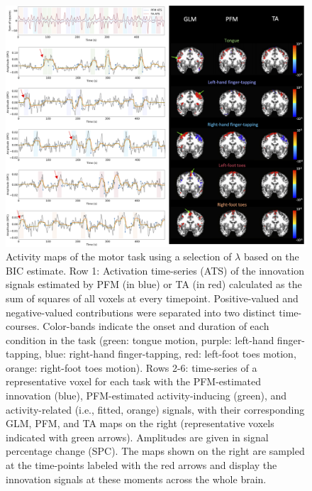 \begin{figure}[t!]
    \begin{center}
        \includegraphics[width=\textwidth]{figures/task_maps.png}
    \end{center}
    \caption{Activity maps of the motor task using a selection of $\lambda$ based on the BIC estimate. Row 1: Activation time-series (ATS) of the innovation signals estimated by PFM (in blue) or TA (in red) calculated as the sum of squares of all voxels at every timepoint. Positive-valued and negative-valued contributions were separated into two distinct time-courses. Color-bands indicate the onset and duration of each condition in the task (green: tongue motion, purple: left-hand finger-tapping, blue: right-hand finger-tapping, red: left-foot toes motion, orange: right-foot toes motion). Rows 2-6: time-series of a representative voxel for each task with the PFM-estimated innovation (blue), PFM-estimated activity-inducing (green), and activity-related (i.e., fitted, orange) signals, with their corresponding GLM, PFM, and TA maps on the right (representative voxels indicated with green arrows). Amplitudes are given in signal percentage change (SPC). The maps shown on the right are sampled at the time-points labeled with the red arrows and display the innovation signals at these moments across the whole brain.}
\label{fig:task_maps}
\end{figure}

